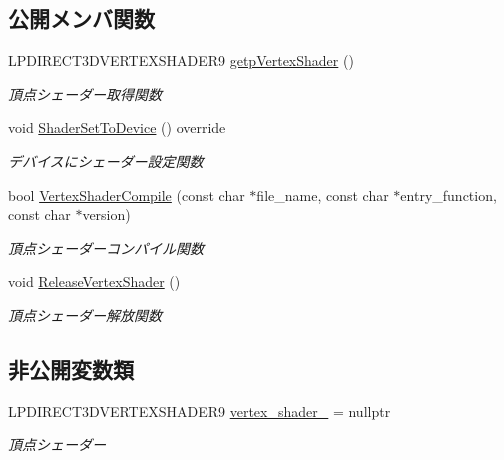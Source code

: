 \subsection*{公開メンバ関数}
\begin{DoxyCompactItemize}
\item 
L\+P\+D\+I\+R\+E\+C\+T3\+D\+V\+E\+R\+T\+E\+X\+S\+H\+A\+D\+E\+R9 \mbox{\hyperlink{class_vertex_shader_base_a2111b20156419548afe14132651d5e21}{getp\+Vertex\+Shader}} ()
\begin{DoxyCompactList}\small\item\em 頂点シェーダー取得関数 \end{DoxyCompactList}\item 
void \mbox{\hyperlink{class_vertex_shader_base_a72c88a06560f530be7cb04923a916904}{Shader\+Set\+To\+Device}} () override
\begin{DoxyCompactList}\small\item\em デバイスにシェーダー設定関数 \end{DoxyCompactList}\item 
bool \mbox{\hyperlink{class_vertex_shader_base_a6565abadb8ac173d3273ab1698d31c6c}{Vertex\+Shader\+Compile}} (const char $\ast$file\+\_\+name, const char $\ast$entry\+\_\+function, const char $\ast$version)
\begin{DoxyCompactList}\small\item\em 頂点シェーダーコンパイル関数 \end{DoxyCompactList}\item 
void \mbox{\hyperlink{class_vertex_shader_base_a42ff1e32a2c231f77d0ba0e6a8312e63}{Release\+Vertex\+Shader}} ()
\begin{DoxyCompactList}\small\item\em 頂点シェーダー解放関数 \end{DoxyCompactList}\end{DoxyCompactItemize}
\subsection*{非公開変数類}
\begin{DoxyCompactItemize}
\item 
L\+P\+D\+I\+R\+E\+C\+T3\+D\+V\+E\+R\+T\+E\+X\+S\+H\+A\+D\+E\+R9 \mbox{\hyperlink{class_vertex_shader_base_a06f34810bedce79d6115c88a61dfbea4}{vertex\+\_\+shader\+\_\+}} = nullptr
\begin{DoxyCompactList}\small\item\em 頂点シェーダー \end{DoxyCompactList}\end{DoxyCompactItemize}
